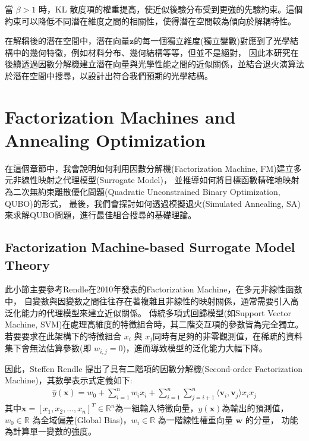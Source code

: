 當 $\beta > 1$ 時，KL 散度項的權重提高，使近似後驗分布受到更強的先驗約束。這個約束可以降低不同潛在維度之間的相關性，使得潛在空間較為傾向於解耦特性。

在解耦後的潛在空間中，潛在向量$\mathbf{z}$的每一個獨立維度(獨立變數)對應到了光學結構中的幾何特徵，例如材料分布、幾何結構等等，但並不是絕對，
因此本研究在後續透過因數分解機建立潛在向量與光學性能之間的近似關係，並結合退火演算法於潛在空間中搜尋，以設計出符合我們預期的光學結構。


\section{Factorization Machines and Annealing Optimization}
在這個章節中，我會說明如何利用因數分解機(Factorization Machine, FM)建立多元非線性映射之代理模型(Surrogate Model)，
並推導如何將目標函數精確地映射為二次無約束離散優化問題(Quadratic Unconstrained Binary Optimization, QUBO)的形式，
最後，我們會探討如何透過模擬退火(Simulated Annealing, SA)來求解QUBO問題，進行最佳組合搜尋的基礎理論。

\subsection{Factorization Machine-based Surrogate Model Theory}
此小節主要參考Rendle在2010年發表的Factorization Machine\cite{rendle2010_factorization}，在多元非線性函數中，
自變數與因變數之間往往存在著複雜且非線性的映射關係，通常需要引入高泛化能力的代理模型來建立近似關係。
傳統多項式回歸模型(如Support Vector Machine, SVM)在處理高維度的特徵組合時，其二階交互項的參數皆為完全獨立。
若要要求在此架構下的特徵組合 $x_i$ 與 $x_j$同時有足夠的非零觀測值，在稀疏的資料集下會無法估算參數(即 $w_{i,j}=0$)，進而導致模型的泛化能力大幅下降。

因此，Steffen Rendle 提出了具有二階項的因數分解機(Second-order Factorization Machine)，其數學表示式定義如下:
\begin{align}
\hat{y}(\mathbf{x}) = w_0 + \sum_{i=1}^{n} w_i x_i + \sum_{i=1}^{n} \sum_{j=i+1}^{n} \langle \mathbf{v}_i, \mathbf{v}_j \rangle x_i x_j
\label{eq:factorization_machine}
\end{align}
其中$\mathbf{x} = [x_1, x_2, \dots, x_n]^T \in \mathbb{R}^n$為一組輸入特徵向量，$\hat{y}(\mathbf{x})$為輸出的預測值，
$w_0 \in \mathbb{R}$ 為全域偏差(Global Bias)，$w_i \in \mathbb{R}$ 為一階線性權重向量 $\mathbf{w}$ 的分量，
功能為計算單一變數的強度。

